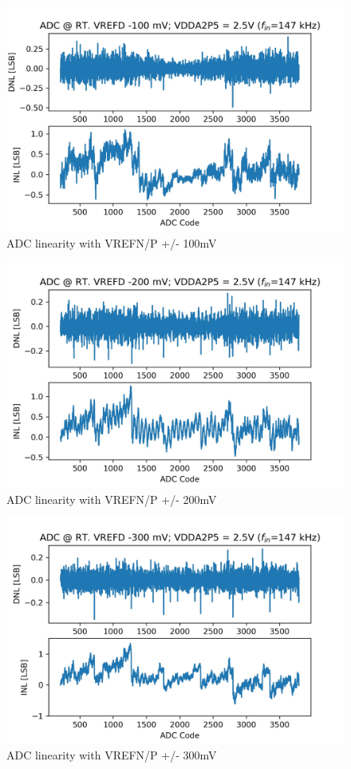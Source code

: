 \begin{figure}[h!]
\centering
  \includegraphics[width=0.7\linewidth]{figures/prakash_fig/linearity_100mv.JPG}
  \caption{ADC linearity with VREFN/P +/- 100mV}
  \label{fig:linearity_100mv}
\end{figure}

\begin{figure}[h!]
\centering
  \includegraphics[width=0.7\linewidth]{figures/prakash_fig/linearity_200mv.JPG}
  \caption{ADC linearity with VREFN/P +/- 200mV}
  \label{fig:linearity_200mv}
\end{figure}

\begin{figure}[h!]
\centering
  \includegraphics[width=0.7\linewidth]{figures/prakash_fig/linearity_300mv.JPG}
  \caption{ADC linearity with VREFN/P +/- 300mV}
  \label{fig:linearity_300mv}
\end{figure}

